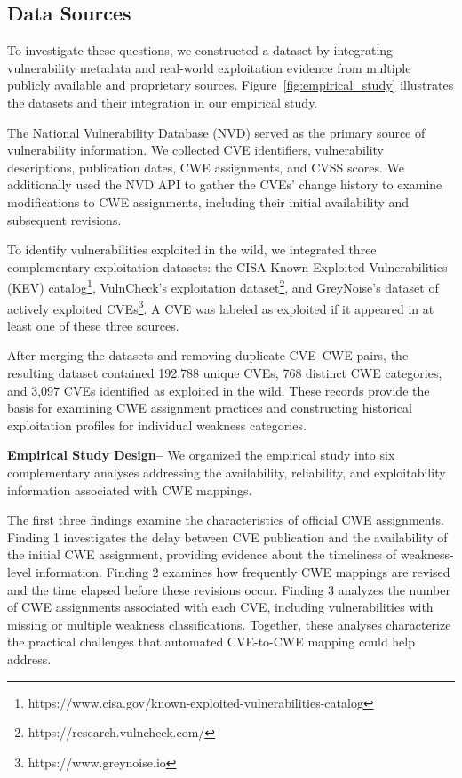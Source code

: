 \documentclass[conference,compsoc]{IEEEtran}
\begin{document}
\subsection{Data Sources}
To investigate these questions, we constructed a
dataset by integrating vulnerability metadata and
real-world exploitation evidence from multiple
publicly available and proprietary sources.
Figure~\ref{fig:empirical_study} illustrates
the datasets and their integration in our
empirical study.

The National Vulnerability Database (NVD) served
as the primary source of vulnerability information.
We collected CVE identifiers, vulnerability
descriptions, publication dates, CWE assignments,
and CVSS scores. We additionally used the NVD
API to gather the CVEs' change history to examine modifications
to CWE assignments, including their initial
availability and subsequent revisions.

To identify vulnerabilities exploited in the wild,
we integrated three complementary exploitation
datasets: the CISA Known Exploited Vulnerabilities
(KEV) catalog\footnote{
https://www.cisa.gov/known-exploited-vulnerabilities-catalog},
VulnCheck's exploitation dataset\footnote{
https://research.vulncheck.com/},
and GreyNoise's dataset of actively exploited
CVEs\footnote{https://www.greynoise.io}.
A CVE was labeled as exploited if it appeared
in at least one of these three sources.

After merging the datasets and removing duplicate
CVE--CWE pairs, the resulting dataset contained
192,788 unique CVEs, 768 distinct CWE categories,
and 3,097 CVEs identified as exploited in the wild.
These records provide the basis for examining
CWE assignment practices and constructing
historical exploitation profiles for individual
weakness categories.

\textbf{Empirical Study Design--}
We organized the empirical study into six
complementary analyses addressing the
availability, reliability, and exploitability
information associated with CWE mappings.

The first three findings examine the
characteristics of official CWE assignments.
Finding 1 investigates the delay between
CVE publication and the availability of
the initial CWE assignment, providing
evidence about the timeliness of weakness-level
information. Finding 2 examines how frequently
CWE mappings are revised and the time
elapsed before these revisions occur.
Finding 3 analyzes the number of CWE
assignments associated with each CVE,
including vulnerabilities with missing
or multiple weakness classifications.
Together, these analyses characterize
the practical challenges that automated
CVE-to-CWE mapping could help address.
\end{document}
